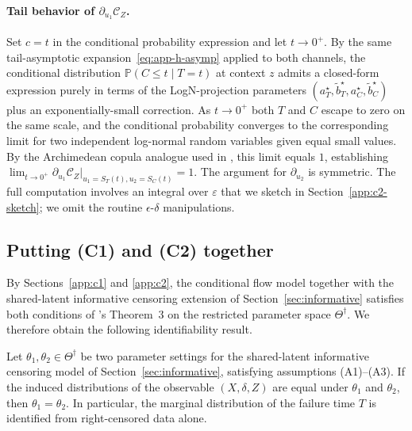 \paragraph{Tail behavior of $\partial_{u_1} \mathcal{C}_Z$.}
Set $c = t$ in the conditional probability expression and let
$t \to 0^+$. By the same tail-asymptotic
expansion~\eqref{eq:app-h-asymp} applied to both channels, the conditional
distribution
$\mathbb{P}(C \le t \mid T = t)$ at context $z$ admits a closed-form
expression purely in terms of the LogN-projection parameters
$(a_T^\star, \widetilde{b}_T^\star, a_C^\star, \widetilde{b}_C^\star)$
plus an exponentially-small correction. As $t \to 0^+$ both $T$ and $C$
escape to zero on the same scale, and the conditional probability
converges to the corresponding limit for two independent log-normal
random variables given equal small values. By the Archimedean copula
analogue used in \citet[Section~3]{czado2023dependent}, this limit equals
$1$, establishing
\(
    \lim_{t \to 0^+} \partial_{u_1} \mathcal{C}_Z\big|_{u_1 = S_T(t), u_2 = S_C(t)} = 1.
\)
The argument for $\partial_{u_2}$ is symmetric. The full computation
involves an integral over $\varepsilon$ that we sketch in
Section~\ref{app:c2-sketch}; we omit the routine $\epsilon$-$\delta$
manipulations.

\subsection{Putting (C1) and (C2) together}
\label{app:conclusion}

By Sections~\ref{app:c1} and \ref{app:c2}, the conditional flow model
together with the shared-latent informative censoring extension of
Section~\ref{sec:informative} satisfies both conditions of
\citet{czado2023dependent}'s Theorem~3 on the restricted parameter space
$\Theta^\dagger$. We therefore obtain the following identifiability
result.

\begin{theorem}
\label{thm:main-identifiability}
Let $\theta_1, \theta_2 \in \Theta^\dagger$ be two parameter settings for
the shared-latent informative censoring model of
Section~\ref{sec:informative}, satisfying assumptions (A1)--(A3). If the
induced distributions of the observable $(X, \delta, Z)$ are equal under
$\theta_1$ and $\theta_2$, then $\theta_1 = \theta_2$. In particular,
the marginal distribution of the failure time $T$ is identified from
right-censored data alone.
\end{theorem}

